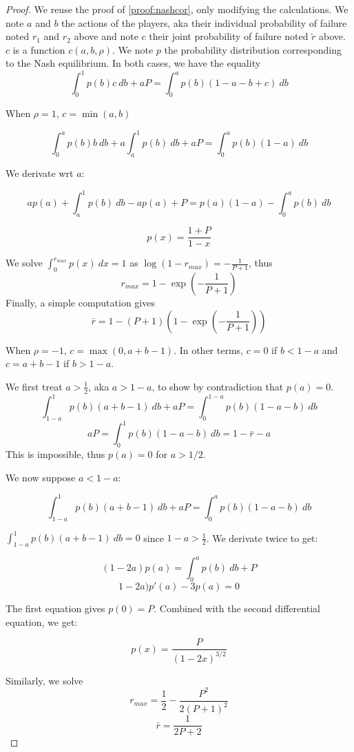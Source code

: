 \documentclass[preprint,12pt,authoryear]{elsarticle}
\theoremstyle{definition}
\begin{document}
\nashwithcor*
\begin{proof}
        We reuse the proof of \ref{proof:nashcor}, only modifying the calculations.
    We note $a$ and $b$ the actions of the players, aka their individual probability of failure noted $r_1$ and $r_2$ above and note $c$ their joint probability of failure noted $\tilde r$ above. $c$ is a function $c(a,b,\rho)$. We note $p$ the probability distribution corresponding to the Nash equilibrium.
    In both cases, we have the equality $$\int_0^1 p(b) c~db + a P= \int_0^a p(b)(1-a-b+c)~db$$

    When $\rho = 1$, $c = \min(a, b)$

    $$\int_0^a p(b) b~db + a \int_a^1 p(b)~db + a P= \int_0^a p(b)(1-a)~db$$

    We derivate wrt $a$:

    $$a p(a) + \int_a^1 p(b)~db - ap(a) + P= p(a)(1-a) - \int_0^a p(b)~db$$

    $$p(x) = \frac{1+P}{1-x}$$

    We solve $\int_0^{r_{max}} p(x)~dx=1$ as $\log(1-r_{max}) = -\frac{1}{P+1}$, thus
    $$r_{max} = 1 - \exp\left(-\frac{1}{P+1}\right)$$
    Finally, a simple computation gives $$\bar r = 1 - (P+1)\left(1-\exp\left(-\frac{1}{P+1}\right)\right)$$
    
    

    When $\rho = -1$, $c = \max(0, a+b-1)$. In other terms, $c=0$ if $b<1-a$ and $c=a+b-1$ if $b>1-a$.

    We first treat $a>\frac{1}{2}$, aka $a>1-a$, to show by contradiction that $p(a) = 0$.
    $$\int_{1-a}^1 p(b)(a+b-1)~db+ aP= \int_0^{1-a} p(b)(1-a-b)~db$$
    $$aP= \int_0^1 p(b)(1-a-b)~db = 1 - \bar r - a$$
    This is impossible, thus $p(a) = 0$ for $a> 1/2$.

    We now suppose $a < 1-a$:

    $$\int_{1-a}^1 p(b)(a+b-1)~db + aP= \int_0^a p(b) (1-a-b)~db$$

    $\int_{1-a}^1 p(b)(a+b-1)~db = 0$ since $1-a >  \frac12$.
    We derivate twice to get:

    $$(1-2a)p(a) = \int_0^a p(b)~db + P$$
    $$1-2a) p'(a) - 3p(a) = 0$$

    The first equation gives $p(0) = P$. Combined with the second differential equation, we get:

    $$p(x) =\frac{P}{(1-2x)^{3/2}}$$

    Similarly, we solve  $$r_{max} = \frac{1}{2} - \frac{P^2}{2(P+1)^2}$$
    $$\bar r = \frac{1}{2P+2}$$
\end{proof}
\end{document}
